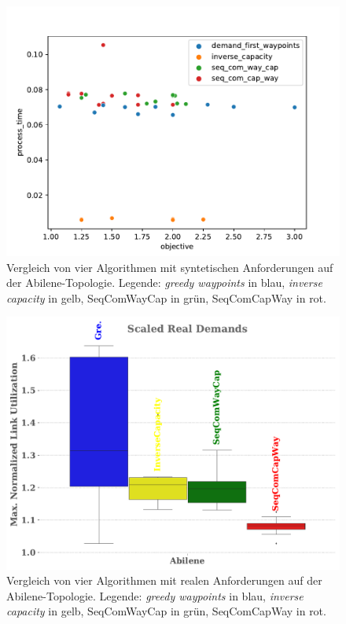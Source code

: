 \documentclass[sigconf, nonacm, review]{acmart}
\begin{document}
\begin{figure}
\centering
\includegraphics[width=\linewidth]{figures/pouria_colored_scatter_plot_results_all_algorithms.pdf}
\caption{Vergleich von vier Algorithmen mit syntetischen Anforderungen auf der Abilene-Topologie. Legende: \emph{greedy waypoints} in blau, \emph{inverse capacity} in gelb, SeqComWayCap in gr\"un, SeqComCapWay in rot.}
\label{fig:pouriaScatterSynthetic}
\end{figure}
\begin{figure}
\centering
\includegraphics[width=\linewidth]{figures/pouria_real_demands.pdf}
\caption{Vergleich von vier Algorithmen mit realen Anforderungen auf der Abilene-Topologie. Legende: \emph{greedy waypoints} in blau, \emph{inverse capacity} in gelb, SeqComWayCap in gr\"un, SeqComCapWay in rot.}
\label{fig:pouriaBoxplotReal}
\end{figure}
\end{document}
